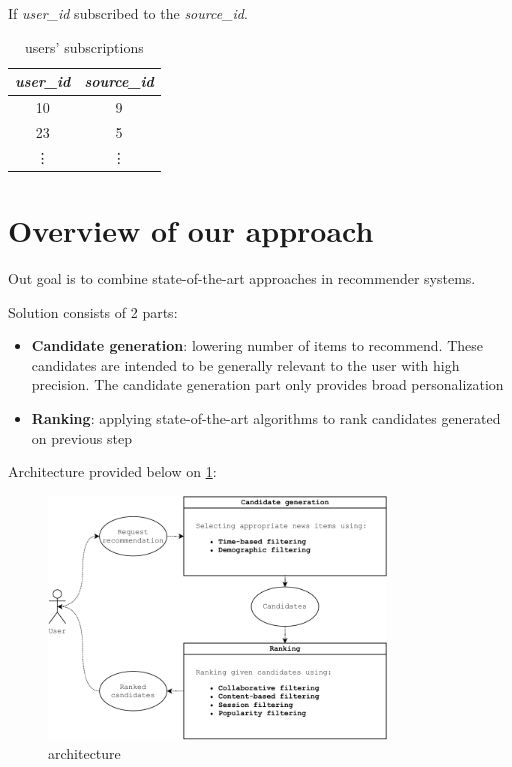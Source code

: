 \documentclass{article}
\begin{document}
    If \emph{user\_id} subscribed to the \emph{source\_id}.

    \begin{table}[h]
        \centering
        \begin{tabular}{cc}
            \toprule

            \emph{user\_id} & \emph{source\_id} \\\midrule

            10 & 9  \\
            23 & 5  \\
            \vdots & \vdots  \\\bottomrule

        \end{tabular}

        \caption{users' subscriptions}
        \label{tab:subscriptions}
    \end{table}




    \newpage
    \section{Overview of our approach}
    \label{sec:overview}

    Out goal is to combine state-of-the-art approaches in recommender systems.

    Solution consists of 2 parts:

    \begin{itemize}
        \item \textbf{Candidate generation}: lowering number of items to recommend. These candidates are intended to be generally relevant to the user with high precision. The candidate generation part only provides broad personalization
        \item \textbf{Ranking}: applying state-of-the-art algorithms to rank candidates generated on previous step
    \end{itemize}

    Architecture provided below on \cref{fig:architecture}:

    \begin{figure}[h]
        \centering
        \includegraphics[width=0.8\textwidth]{./images/architechture.pdf}
        \caption{architecture}
        \label{fig:architecture}
    \end{figure}
\end{document}
